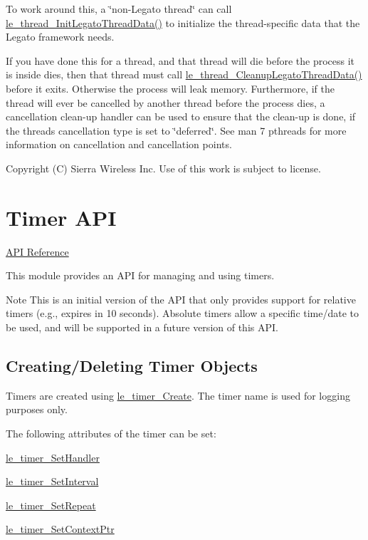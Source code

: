 To work around this, a \char`\"{}non-\/\+Legato thread\char`\"{} can call \hyperlink{le__thread_8h_a3e35d530ce76e97a627dc60100fc1475}{le\+\_\+thread\+\_\+\+Init\+Legato\+Thread\+Data()} to initialize the thread-\/specific data that the Legato framework needs.

If you have done this for a thread, and that thread will die before the process it is inside dies, then that thread must call \hyperlink{le__thread_8h_aef59d0ded85da6ddd169a661824670d0}{le\+\_\+thread\+\_\+\+Cleanup\+Legato\+Thread\+Data()} before it exits. Otherwise the process will leak memory. Furthermore, if the thread will ever be cancelled by another thread before the process dies, a cancellation clean-\/up handler can be used to ensure that the clean-\/up is done, if the thread\textquotesingle{}s cancellation type is set to \char`\"{}deferred\char`\"{}. See \textquotesingle{}man 7 pthreads\textquotesingle{} for more information on cancellation and cancellation points.





Copyright (C) Sierra Wireless Inc. Use of this work is subject to license. \hypertarget{c_timer}{}\section{Timer A\+P\+I}\label{c_timer}
\hyperlink{le__timer_8h}{A\+P\+I Reference}





This module provides an A\+P\+I for managing and using timers.

\begin{DoxyNote}{Note}
This is an initial version of the A\+P\+I that only provides support for relative timers (e.\+g., expires in 10 seconds). Absolute timers allow a specific time/date to be used, and will be supported in a future version of this A\+P\+I.
\end{DoxyNote}
\hypertarget{c_timer_timer_objects}{}\subsection{Creating/\+Deleting Timer Objects}\label{c_timer_timer_objects}
Timers are created using \hyperlink{le__timer_8h_aee41169a210378b369f440cf99146522}{le\+\_\+timer\+\_\+\+Create}. The timer name is used for logging purposes only.

The following attributes of the timer can be set\+:
\begin{DoxyItemize}
\item \hyperlink{le__timer_8h_abbf8d4c3c78d7bf5801b94071adcb6c6}{le\+\_\+timer\+\_\+\+Set\+Handler}
\item \hyperlink{le__timer_8h_a0a103d5cef5e83fc9088859d527bbd43}{le\+\_\+timer\+\_\+\+Set\+Interval}
\item \hyperlink{le__timer_8h_a292b0a7d6dc0796a36a54fd04c6a7eeb}{le\+\_\+timer\+\_\+\+Set\+Repeat}
\item \hyperlink{le__timer_8h_af6900bdb4653ff95f7f7be918b9e482d}{le\+\_\+timer\+\_\+\+Set\+Context\+Ptr}
\end{DoxyItemize}

